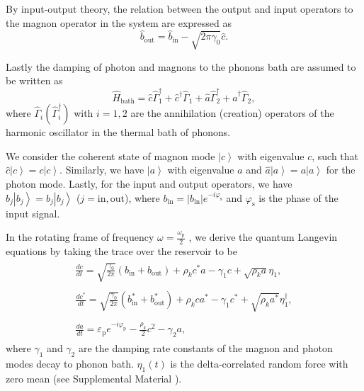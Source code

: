 \documentclass[%
 reprint,
 amsmath,amssymb,
 aps,
prb,
]{revtex4-2}
\begin{document}
By input-output theory, the relation between the output and input operators to the magnon operator in the system are expressed as \cite{Yamamoto2016,Gardiner1985,Walls,jacobs2014}
\begin{equation}
    {\hat{b}}_{\mathrm{out}}={\hat{b}}_{\mathrm{in}} - \sqrt{2\pi\gamma_0}{\hat{c}}.
\end{equation}

Lastly the damping of photon and magnons to the phonons bath are assumed to be written as 
\begin{equation}   {\hat{H}}_{\mathrm{bath}}={\hat{c}}{\hat{\Gamma}}_1^\dag+{\hat{c}}^\dag{\hat{\Gamma}}_1+{\hat{a}}{\hat{\Gamma}}_2^\dag+{\hat{a}}^\dag{\hat{\Gamma}}_2,	
\end{equation}		
where ${\hat{\Gamma}}_i$$\left(\hat{\Gamma}_i^\dag \right)$ with $i=1,2$  are the annihilation (creation) operators of the harmonic oscillator in the thermal bath of phonons. 

We consider the coherent state of magnon mode $\left|c\right\rangle$ with eigenvalue $c$,  such that ${\hat{c}}\left|c\right\rangle=c\left|c\right\rangle$. Similarly, we have $\left|a\right\rangle$ with eigenvalue $a$
and ${\hat{a}}\left|a\right\rangle=a\left|a\right\rangle$ for the photon mode. Lastly, for the input and output operators, we have ${\hat{b}}_j\left|b_j\right\rangle=b_j\left|b_j\right\rangle$ ($j= \mathrm{in}, \mathrm{out}$), where $b_{\mathrm{in}}=\left|b_{\mathrm{in}}\right| e^{-i\varphi_\mathrm{s}}$ and $\varphi_\mathrm{s}$ is the phase of the input signal.  

In the rotating frame of frequency $\omega=\frac{\omega_\mathrm{p}}{2}$ , we derive the quantum Langevin equations by taking the trace over the reservoir to be
\begin{subequations}
    \begin{align}
        \begin{split}
            \frac{d c}{d t}=\sqrt{\frac{\gamma_\mathrm{0}}{2\pi}}\left(b_{\mathrm{in}}+b_{\mathrm{out}} \right) +\rho_kc^\ast a-\gamma_1c+\sqrt{\rho_k a}\eta_1,
        \end{split}\\
        \begin{split}
            \frac{d c^\ast}{dt}=\sqrt{\frac{\gamma_\mathrm{0}}{2\pi}}\left(b_{\mathrm{in}}^*+b_{\mathrm{out}}^* \right) +\rho_kca^\ast-\gamma_1c^\ast+\sqrt{\rho_k a^\ast}\eta_1^\dag,
        \end{split}\\
        \begin{split}
            \frac{d a}{d t}=\varepsilon_\mathrm{p}e^{-i\varphi_\mathrm{p}}-\frac{\rho_k}{2}c^2-\gamma_2a,
        \end{split}
    \end{align}
\end{subequations}
where $\gamma_1$ and $\gamma_2$ are the damping rate constants of the magnon and photon modes decay to phonon bath. $\eta_1\left(t\right)$ is the delta-correlated random force with zero mean (see Supplemental Material \cite{Suppl}).
\end{document}
